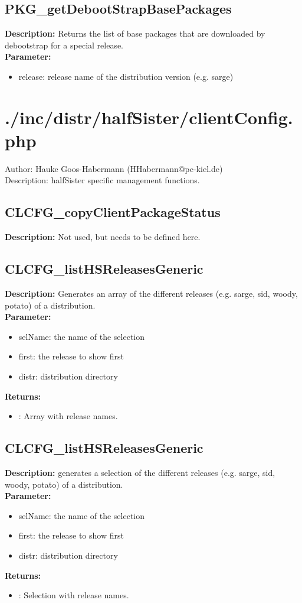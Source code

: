 \subsection{PKG\_getDebootStrapBasePackages}
\textbf{Description:} Returns the list of base packages that are downloaded by debootstrap for a special release.\\
\textbf{Parameter:}
\begin{itemize}
\item release: release name of the distribution version (e.g. sarge)
\end{itemize}

\newpage\section{./inc/distr/halfSister/clientConfig.php}
 Author: Hauke Goos-Habermann (HHabermann@pc-kiel.de)\\
 Description: halfSister specific management functions.\\

\subsection{CLCFG\_copyClientPackageStatus}
\textbf{Description:} Not used, but needs to be defined here.\\

\subsection{CLCFG\_listHSReleasesGeneric}
\textbf{Description:} Generates an array of the different releases (e.g. sarge, sid, woody, potato) of a distribution.\\
\textbf{Parameter:}
\begin{itemize}
\item selName: the name of the selection
\item first: the release to show first
\item distr: distribution directory
\end{itemize}
\textbf{Returns:}
\begin{itemize}
\item : Array with release names.
\end{itemize}

\subsection{CLCFG\_listHSReleasesGeneric}
\textbf{Description:} generates a selection of the different releases (e.g. sarge, sid, woody, potato) of a distribution.\\
\textbf{Parameter:}
\begin{itemize}
\item selName: the name of the selection
\item first: the release to show first
\item distr: distribution directory
\end{itemize}
\textbf{Returns:}
\begin{itemize}
\item : Selection with release names.
\end{itemize}

